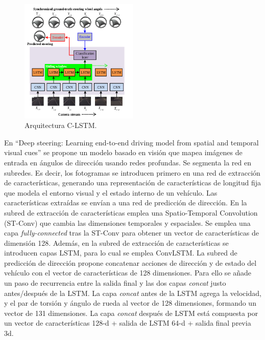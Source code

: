 \begin{figure}
\begin{center}
	\includegraphics[width=0.5\textwidth]{figures/Estado_arte/clstm.png}
   \caption{Arquitectura C-LSTM.}
	\label{fig.clstm}
\end{center}
\end{figure}

En ``Deep  steering:  Learning  end-to-end  driving  model  from spatial and temporal visual cues'' \cite{deep-steering} se propone un modelo basado en visión que mapea imágenes de entrada en ángulos de dirección usando redes profundas. Se segmenta la red en subredes. Es decir, los fotogramas se introducen primero en una red de extracción de características, generando una representación de características de longitud fija que modela el entorno visual y el estado interno de un vehículo. Las características extraídas se envían a una red de predicción de dirección. En la subred de extracción de características emplea una Spatio-Temporal Convolution (ST-Conv) que cambia las dimensiones temporales y espaciales. Se emplea una capa \textit{fully-connected} tras la ST-Conv para obtener un vector de características de dimensión 128. Además, en la subred de extracción de características se introducen capas LSTM, para lo cual se emplea ConvLSTM. La subred de predicción de dirección propone concatenar acciones de dirección y de estado del vehículo con el vector de características de 128 dimensiones. Para ello se añade un paso de recurrencia entre la salida final y las dos capas \textit{concat} justo antes/después de la LSTM. La capa \textit{concat} antes de la LSTM agrega la velocidad, y el par de torsión y ángulo de rueda al vector de 128 dimensiones, formando un vector de 131 dimensiones. La capa \textit{concat} después de LSTM está compuesta por un vector de características 128-d + salida de LSTM 64-d + salida final previa 3d.\\

